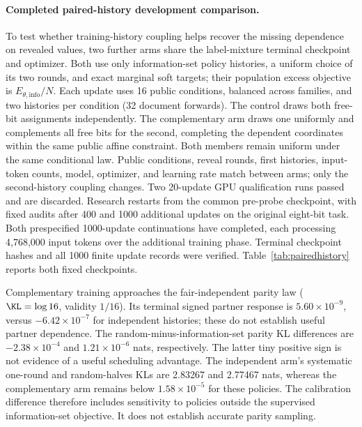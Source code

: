 \paragraph{Completed paired-history development comparison.}
To test whether training-history coupling helps recover the missing dependence on revealed values, two further arms share the label-mixture terminal checkpoint and optimizer. Both use only information-set policy histories, a uniform choice of its two rounds, and exact marginal soft targets; their population excess objective is $E_{\theta,\mathrm{info}}/N$. Each update uses 16 public conditions, balanced across families, and two histories per condition (32 document forwards). The control draws both free-bit assignments independently. The complementary arm draws one uniformly and complements all free bits for the second, completing the dependent coordinates within the same public affine constraint. Both members remain uniform under the same conditional law. Public conditions, reveal rounds, first histories, input-token counts, model, optimizer, and learning rate match between arms; only the second-history coupling changes. Two 20-update GPU qualification runs passed and are discarded. Research restarts from the common pre-probe checkpoint, with fixed audits after 400 and 1000 additional updates on the original eight-bit task. Both prespecified 1000-update continuations have completed, each processing 4,768,000 input tokens over the additional training phase. Terminal checkpoint hashes and all 1000 finite update records were verified. Table~\ref{tab:pairedhistory} reports both fixed checkpoints.



Complementary training approaches the fair-independent parity law ($\KL=\log16$, validity $1/16$). Its terminal signed partner response is $5.60\times10^{-9}$, versus $-6.42\times10^{-7}$ for independent histories; these do not establish useful partner dependence. The random-minus-information-set parity KL differences are $-2.38\times10^{-4}$ and $1.21\times10^{-6}$ nats, respectively. The latter tiny positive sign is not evidence of a useful scheduling advantage. The independent arm's systematic one-round and random-halves KLs are 2.83267 and 2.77467 nats, whereas the complementary arm remains below $1.58\times10^{-5}$ for these policies. The calibration difference therefore includes sensitivity to policies outside the supervised information-set objective. It does not establish accurate parity sampling.

